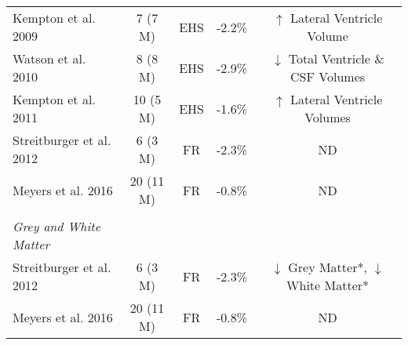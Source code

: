 \begin{table}
\begin{center}
\begin{tabular}{lcccc}
			\footnotesize Kempton et al. 2009 \cite{kempton_effects_2009} & \footnotesize 7 \scriptsize(7 M) & \footnotesize EHS & \footnotesize -2.2\% & \footnotesize ${\uparrow}$ \footnotesize Lateral Ventricle Volume \\

			\footnotesize Watson et al. 2010 \cite{watson_effect_2010} & \footnotesize 8 \scriptsize(8 M) & \footnotesize EHS & \footnotesize -2.9\% & \footnotesize ${\downarrow}$ Total Ventricle \& CSF Volumes \\
			
			\footnotesize Kempton et al. 2011 \cite{kempton_dehydration_2011} & \footnotesize 10 \scriptsize(5 M) & \footnotesize EHS & \footnotesize -1.6\% & \footnotesize ${\uparrow}$ \footnotesize Lateral Ventricle Volumes \\
			
			\footnotesize Streitburger et al. 2012 \cite{streitburger_investigating_2012} & \footnotesize 6 \scriptsize(3 M) & \footnotesize FR & \footnotesize -2.3\% & \footnotesize ND \\
			
			\footnotesize Meyers et al. 2016 \cite{meyers_does_2016} & \footnotesize 20 \scriptsize(11 M) & \footnotesize FR & \footnotesize -0.8\% & \footnotesize ND \\
			
			&&&& \\
			\footnotesize\textit{Grey and White Matter} &&&& \\
			\footnotesize Streitburger et al. 2012 \cite{streitburger_investigating_2012} & \footnotesize 6 \scriptsize(3 M) & \footnotesize FR & \footnotesize -2.3\% & \footnotesize ${\downarrow}$ Grey Matter*, ${\downarrow}$ White Matter* \\
			
			\footnotesize Meyers et al. 2016 \cite{meyers_does_2016} & \footnotesize 20 \scriptsize(11 M) & \footnotesize FR & \footnotesize -0.8\% & \footnotesize ND \\
			
			\hline
			
		\end{tabular}
		\label{tbl:mri_deh}
	\end{center}
\end{table}

